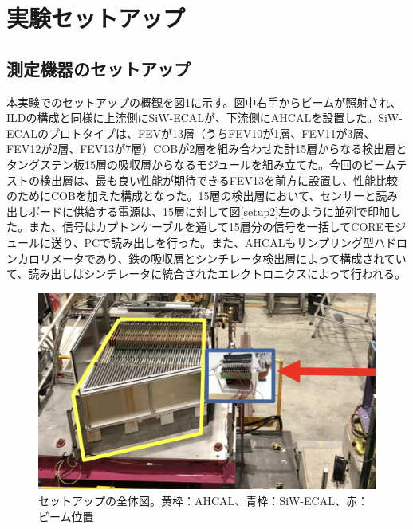 \section{実験セットアップ}
\subsection{測定機器のセットアップ}
本実験でのセットアップの概観を図\ref{setup1}に示す。図中右手からビームが照射され、ILDの構成と同様に上流側にSiW-ECALが、下流側にAHCALを設置した。SiW-ECALのプロトタイプは、FEVが13層（うちFEV10が1層、FEV11が3層、FEV12が2層、FEV13が7層）COBが2層を組み合わせた計15層からなる検出層とタングステン板15層の吸収層からなるモジュールを組み立てた。今回のビームテストの検出層は、最も良い性能が期待できるFEV13を前方に設置し、性能比較のためにCOBを加えた構成となった。15層の検出層において、センサーと読み出しボードに供給する電源は、15層に対して図\ref{setup2}左のように並列で印加した。また、信号はカプトンケーブルを通して15層分の信号を一括してCOREモジュールに送り、PCで読み出しを行った。また、AHCALもサンプリング型ハドロンカロリメータであり、鉄の吸収層とシンチレータ検出層によって構成されていて、読み出しはシンチレータに統合されたエレクトロニクスによって行われる。
\begin{figure}[H]
\begin{center}
 \includegraphics[keepaspectratio, scale=0.3]
 	{Figure/Beamtest/setup1.png}
 		\caption[セットアップの全体図]{セットアップの全体図。黄枠：AHCAL、青枠：SiW-ECAL、赤：ビーム位置}
		\label{setup1}
		\end{center}
\end{figure}

